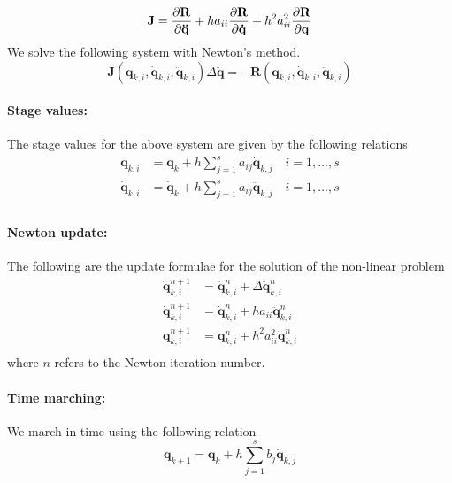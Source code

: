 \documentclass[pdftex,11pt,letter]{article}
\begin{document}
\begin{multicols}{2}
\begin{equation}
  \mathbf{J} = \dfrac{\partial \mathbf{R}}{\partial \mathbf{\ddot{q}}} + h a_{ii}
  \dfrac{\partial \mathbf{R}}{\partial \mathbf{\dot{q}}} + h^2 a_{ii}^2
  \dfrac{\partial \mathbf{R}}{\partial \mathbf{{q}}}
\end{equation}
We solve the following system with Newton's method.
\begin{equation}
 \mathbf{J}
 \left(\mathbf{q}_{k,i},\mathbf{\dot{q}}_{k,i},\mathbf{\ddot{q}}_{k,i}\right)
 \Delta\mathbf{\ddot{q}} = -\mathbf{R}
 \left(\mathbf{q}_{k,i},\mathbf{\dot{q}}_{k,i},\mathbf{\ddot{q}}_{k,i}\right)
\end{equation}

\paragraph{Stage values:}
The stage values for the above system are given by the following relations
\begin{equation}
  \begin{split}
    \mathbf{q}_{k,i}  & = \mathbf{q}_{k} + h \sum_{j=1}^s a_{ij} \mathbf{\dot{q}}_{k,j} \quad i = 1,\ldots,s \\
    \mathbf{\dot{q}}_{k,i}  & = \mathbf{\dot{q}}_{k} + h \sum_{j=1}^s a_{ij} \mathbf{\ddot{q}}_{k,j} \quad i = 1,\ldots,s \\
  \end{split}
\end{equation}

\paragraph{Newton update:}
The following are the update formulae for the solution of the non-linear problem
\begin{equation}\label{newton_update2}
  \begin{split}
    \mathbf{\ddot{q}}_{k,i}^{n+1} & = \mathbf{\ddot{q}}_{k,i}^{n} +
    \Delta\mathbf{\ddot{q}}_{k,i}^{n} \\
    \mathbf{\dot{q}}_{k,i}^{n+1} & = \mathbf{\dot{q}}_{k,i}^n + h a_{ii}
    \mathbf{\ddot{q}}_{k,i}^n \\
    \mathbf{{q}}_{k,i}^{n+1} & = \mathbf{{q}}_{k,i}^n + h^2 a_{ii}^2
    \mathbf{\ddot{q}}_{k,i}^n \\
  \end{split}
\end{equation}
where $n$ refers to the Newton iteration number.

\paragraph{Time marching:}
We march in time using the following relation
\begin{equation}
  \mathbf{q}_{k+1} = \mathbf{q}_{k} +h \sum_{j=1}^s b_j \mathbf{\dot{q}}_{k,j}
\end{equation}


\end{multicols}
\end{document}
